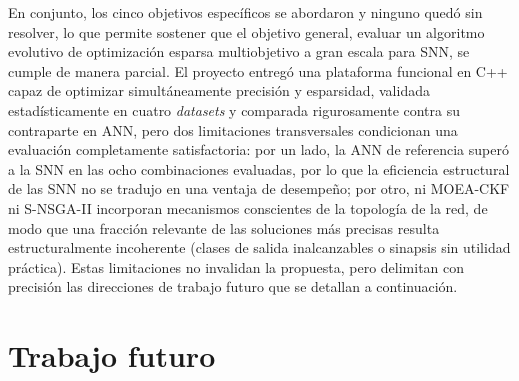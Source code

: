 En conjunto, los cinco objetivos específicos se abordaron y ninguno quedó sin resolver, lo que permite sostener que el objetivo general, evaluar un algoritmo evolutivo de optimización esparsa multiobjetivo a gran escala para SNN, se cumple de manera parcial. El proyecto entregó una plataforma funcional en C++ capaz de optimizar simultáneamente precisión y esparsidad, validada estadísticamente en cuatro \textit{datasets} y comparada rigurosamente contra su contraparte en ANN, pero dos limitaciones transversales condicionan una evaluación completamente satisfactoria: por un lado, la ANN de referencia superó a la SNN en las ocho combinaciones evaluadas, por lo que la eficiencia estructural de las SNN no se tradujo en una ventaja de desempeño; por otro, ni MOEA-CKF ni S-NSGA-II incorporan mecanismos conscientes de la topología de la red, de modo que una fracción relevante de las soluciones más precisas resulta estructuralmente incoherente (clases de salida inalcanzables o sinapsis sin utilidad práctica). Estas limitaciones no invalidan la propuesta, pero delimitan con precisión las direcciones de trabajo futuro que se detallan a continuación.

\section{Trabajo futuro}

